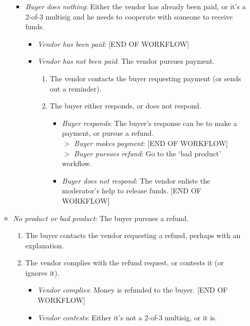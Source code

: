\begin{enumerate}
\begin{itemize}
\begin{itemize}
            \item {\em Buyer does nothing}: Either the vendor has already been paid, or it's a 2-of-3 multisig and he needs to cooperate with someone to receive funds.
            \begin{itemize}
                \item {\em Vendor has been paid}: [END OF WORKFLOW]
                \item {\em Vendor has not been paid}: The vendor pursues payment.
                \begin{enumerate}
                    \item The vendor contacts the buyer requesting payment (or sends out a reminder).
                    \item The buyer either responds, or does not respond.
                    \begin{itemize}
                        \item {\em Buyer responds}: The buyer's response can be to make a payment, or pursue a refund.\\
                        $>$ {\em Buyer makes payment}: [END OF WORKFLOW]\\
                        $>$ {\em Buyer pursues refund}: Go to the `bad product' workflow.
                        \item {\em Buyer does not respond}: The vendor enlists the moderator's help to release funds. [END OF WORKFLOW]
                    \end{itemize}{}
                \end{enumerate}{}
            \end{itemize}
        \end{itemize}{}
        \item {\em No product or bad product}: The buyer pursues a refund.
        \begin{enumerate}
            \item The buyer contacts the vendor requesting a refund, perhaps with an explanation.
            \item The vendor complies with the refund request, or contests it (or ignores it).
            \begin{itemize}
                \item {\em Vendor complies}: Money is refunded to the buyer. [END OF WORKFLOW]
                \item {\em Vendor contests}: Either it's not a 2-of-3 multisig, or it is.
                \begin{itemize}

\end{itemize}
\end{itemize}
\end{enumerate}
\end{itemize}
\end{enumerate}
